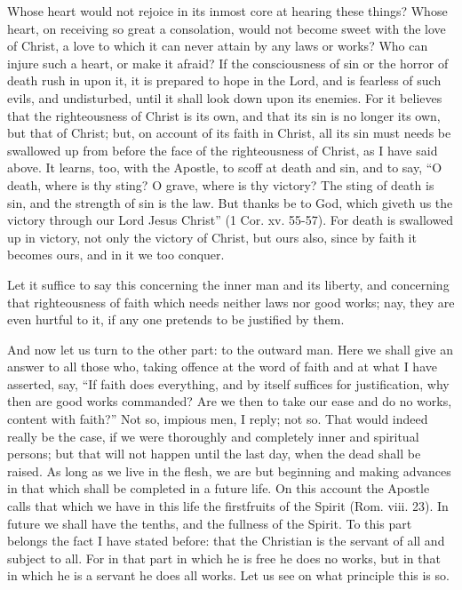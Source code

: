 Whose heart would not rejoice in its inmost core at hearing these things?
Whose heart, on receiving so great a consolation, would not become sweet
with the love of Christ, a love to which it can never attain by any laws
or works? Who can injure such a heart, or make it afraid? If the
consciousness of sin or the horror of death rush in upon it, it is
prepared to hope in the Lord, and is fearless of such evils, and
undisturbed, until it shall look down upon its enemies. For it believes
that the righteousness of Christ is its own, and that its sin is no longer
its own, but that of Christ; but, on account of its faith in Christ, all
its sin must needs be swallowed up from before the face of the
righteousness of Christ, as I have said above. It learns, too, with the
Apostle, to scoff at death and sin, and to say, ``O death, where is thy
sting? O grave, where is thy victory? The sting of death is sin, and the
strength of sin is the law. But thanks be to God, which giveth us the
victory through our Lord Jesus Christ'' (1 Cor. xv. 55-57). For death is
swallowed up in victory, not only the victory of Christ, but ours also,
since by faith it becomes ours, and in it we too conquer.

Let it suffice to say this concerning the inner man and its liberty, and
concerning that righteousness of faith which needs neither laws nor good
works; nay, they are even hurtful to it, if any one pretends to be
justified by them.

And now let us turn to the other part: to the outward man. Here we shall
give an answer to all those who, taking offence at the word of faith and
at what I have asserted, say, ``If faith does everything, and by itself
suffices for justification, why then are good works commanded? Are we then
to take our ease and do no works, content with faith?'' Not so, impious
men, I reply; not so. That would indeed really be the case, if we were
thoroughly and completely inner and spiritual persons; but that will not
happen until the last day, when the dead shall be raised. As long as we
live in the flesh, we are but beginning and making advances in that which
shall be completed in a future life. On this account the Apostle calls
that which we have in this life the firstfruits of the Spirit (Rom. viii.
23). In future we shall have the tenths, and the fullness of the Spirit.
To this part belongs the fact I have stated before: that the Christian is
the servant of all and subject to all. For in that part in which he is
free he does no works, but in that in which he is a servant he does all
works. Let us see on what principle this is so.

